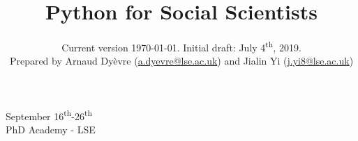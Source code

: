 \documentclass{amsart}
\theoremstyle{definition}
\theoremstyle{remark}
\numberwithin{equation}{section}
\begin{document}
\title{Python for Social Scientists}




\date{Current version \today. Initial draft: July 4\textsuperscript{th}, 2019. \\
Prepared by Arnaud Dy\`evre (\href{
mailto:a.dyevre@lse.ac.uk}{a.dyevre@lse.ac.uk}) and Jialin Yi (\href{
mailto:j.yi8@lse.ac.uk}{j.yi8@lse.ac.uk})}




\maketitle

\begin{center}
    \Large September 16\textsuperscript{th}-26\textsuperscript{th} \\
    PhD Academy - LSE
\end{center}

\vspace{12pt}

\end{document}
